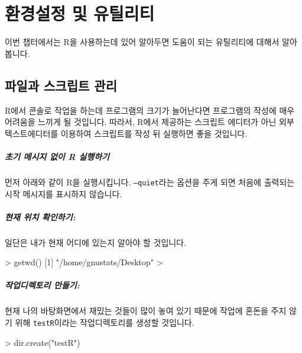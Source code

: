 \documentclass[tutorial.tex]{subfiles}
\begin{document}
\chapter{환경설정 및 유틸리티}

이번 챕터에서는 R을 사용하는데 있어 알아두면 도움이 되는 유틸리티에 대해서 알아봅니다.


\section{파일과 스크립트 관리}

R에서 콘솔로 작업을 하는데 프로그램의 크기가 늘어난다면 프로그램의 작성에 매우 어려움을 느끼게 될 것입니다.
따라서, R에서 제공하는 스크립트 에디터가 아닌 외부 텍스트에디터를 이용하여 스크립트를 작성 뒤 실행하면 좋을 것입니다.

\paragraph{초기 메시지 없이 R 실행하기}
먼저 아래와 같이 R을 실행시킵니다. 
\texttt{--quiet}라는 옵션을 주게 되면 처음에 출력되는 시작 메시지를 표시하지 않습니다. 

\begin{Schunk}
\end{Schunk}

\paragraph{현재 위치 확인하기:}
일단은 내가 현재 어디에 있는지 알아야 할 것입니다.
\begin{Schunk}
\begin{Soutput}
> getwd()
[1] "/home/gnustats/Desktop"
> 
\end{Soutput}
\end{Schunk}

\paragraph{작업디렉토리 만들기:}
현재 나의 바탕화면에서 재밌는 것들이 많이 놓여 있기 때문에 작업에 혼돈을 주지 않기 위해 \texttt{testR}이라는 작업디렉토리를 생성할 것입니다. 
\begin{Schunk}
\begin{Soutput}
> dir.create("testR")
\end{Soutput}
\end{Schunk}
\end{document}
